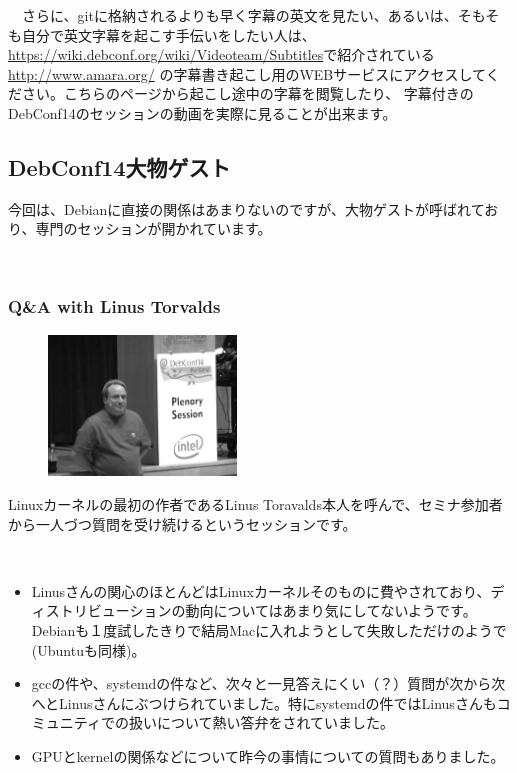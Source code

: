 \documentclass[mingoth,a4paper]{jsarticle}
\begin{document}
　さらに、gitに格納されるよりも早く字幕の英文を見たい、あるいは、そもそも自分で英文字幕を起こす手伝いをしたい人は、
\url{https://wiki.debconf.org/wiki/Videoteam/Subtitles}で紹介されている\url{http://www.amara.org/}
の字幕書き起こし用のWEBサービスにアクセスしてください。こちらのページから起こし途中の字幕を閲覧したり、
字幕付きのDebConf14のセッションの動画を実際に見ることが出来ます。

\subsection{DebConf14大物ゲスト}

 今回は、Debianに直接の関係はあまりないのですが、大物ゲストが呼ばれており、専門のセッションが開かれています。

　\subsubsection{Q\&A with Linus Torvalds}

\begin{figure}
  \includegraphics[width=5cm]{image201409/qa_linus_mono.png}
\end{figure}

  Linuxカーネルの最初の作者であるLinus Toravalds本人を呼んで、セミナ参加者から一人づつ質問を受け続けるというセッションです。

　\begin{itemize}
  \item Linusさんの関心のほとんどはLinuxカーネルそのものに費やされており、ディストリビューションの動向についてはあまり気にしてないようです。
Debianも１度試したきりで結局Macに入れようとして失敗しただけのようで(Ubuntuも同様)。
  \item gccの件や、systemdの件など、次々と一見答えにくい（？）質問が次から次へとLinusさんにぶつけられていました。特にsystemdの件ではLinusさんもコミュニティでの扱いについて熱い答弁をされていました。
  \item GPUとkernelの関係などについて昨今の事情についての質問もありました。
  \end{itemize}
\end{document}
